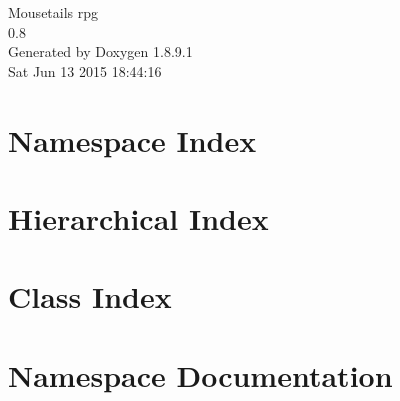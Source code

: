 \documentclass[twoside]{book}
\newcommand{\+}{\discretionary{\mbox{\scriptsize$\hookleftarrow$}}{}{}}
\newcommand{\clearemptydoublepage}{%
  \newpage{\pagestyle{empty}\cleardoublepage}%
}
\begin{document}
\hypersetup{pageanchor=false,
             bookmarks=true,
             bookmarksnumbered=true,
             pdfencoding=unicode
            }
\begin{titlepage}
\vspace*{7cm}
\begin{center}%
{\Large Mousetail\textquotesingle{}s rpg \\[1ex]\large 0.\+8 }\\
\vspace*{1cm}
{\large Generated by Doxygen 1.8.9.1}\\
\vspace*{0.5cm}
{\small Sat Jun 13 2015 18:44:16}\\
\end{center}
\end{titlepage}
\clearemptydoublepage
\tableofcontents
\clearemptydoublepage
{}
\hypersetup{pageanchor=true}

\chapter{Namespace Index}

\chapter{Hierarchical Index}

\chapter{Class Index}

\chapter{Namespace Documentation}















\end{document}
